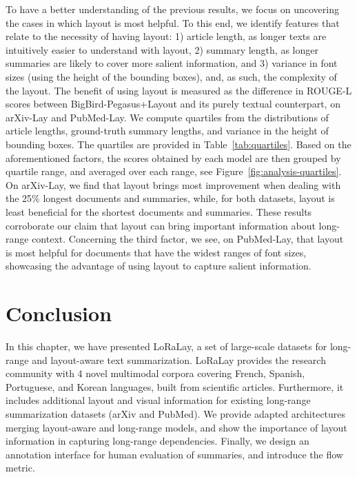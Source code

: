 To have a better understanding of the previous results, we focus on uncovering the cases in which layout is most helpful. To this end, we identify features that relate to the necessity of having layout: 1) article length, as longer texts are intuitively easier to understand with layout, 2) summary length, as longer summaries are likely to cover more salient information, and 3) variance in font sizes (using the height of the bounding boxes), and, as such, the complexity of the layout.
The benefit of using layout is measured as the difference in ROUGE-L scores between BigBird-Pegasus+Layout and its purely textual counterpart, on arXiv-Lay and PubMed-Lay. We compute quartiles from the distributions of article lengths, ground-truth summary lengths, and variance in the height of bounding boxes. The quartiles are provided in Table~\ref{tab:quartiles}. Based on the aforementioned factors, the scores obtained by each model are then grouped by quartile range, and averaged over each range, see Figure~\ref{fig:analysis-quartiles}. On arXiv-Lay, we find that layout brings most improvement when dealing with the 25\% longest documents and summaries, while, for both datasets, layout is least beneficial for the shortest documents and summaries. These results corroborate our claim that layout can bring important information about long-range context. Concerning the third factor, we see, on PubMed-Lay, that layout is most helpful for documents that have the widest ranges of font sizes, showcasing the advantage of using layout to capture salient information. 

\section{Conclusion}

In this chapter, we have presented LoRaLay, a set of large-scale datasets for long-range and layout-aware text summarization. LoRaLay provides the research community with 4 novel multimodal corpora covering French, Spanish, Portuguese, and Korean languages, built from scientific articles. Furthermore, it includes additional layout and visual information for existing long-range summarization datasets (arXiv and PubMed). We provide adapted architectures merging layout-aware and long-range models, and show the importance of layout information in capturing long-range dependencies. Finally, we design an annotation interface for human evaluation of summaries, and introduce the flow metric.